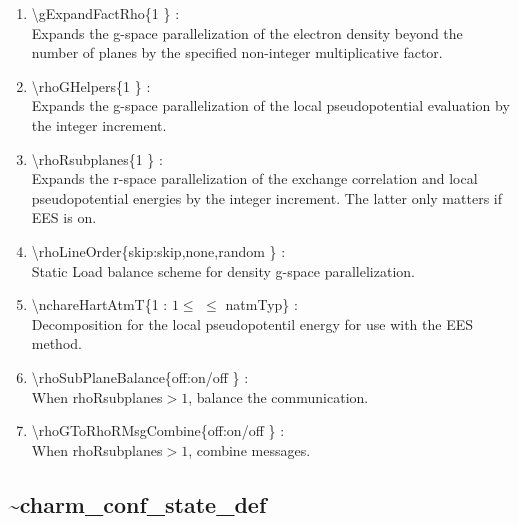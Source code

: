 \documentclass[12pt,titlepage]{article}
\begin{document}
\begin{enumerate}
  \vspace{0.15in} 
  \item \textbackslash{}gExpandFactRho\{1 \} : \\    
  Expands the g-space parallelization of the electron density beyond
  the number of planes by the specified non-integer multiplicative factor. 
  \vspace{0.15in} 
  \item \textbackslash{}rhoGHelpers\{1 \} : \\    
  Expands the g-space parallelization of the local pseudopotential
  evaluation by the integer increment.
  \vspace{0.15in} 
  \item \textbackslash{}rhoRsubplanes\{1 \} : \\    
  Expands the r-space parallelization of the exchange correlation and 
  local pseudopotential energies by the integer increment. 
  The latter only matters if EES is on.
  \vspace{0.15in} 
  \item \textbackslash{}rhoLineOrder\{skip:skip,none,random \} : \\    
  Static Load balance scheme for density g-space parallelization.
  \vspace{0.15in} 
  \item \textbackslash{}nchareHartAtmT\{1 : $1 \leq$ $\leq$ natmTyp\} : \\ 
  Decomposition for the local pseudopotentil energy for use with the 
  EES method.
  \vspace{0.15in} 
  \item \textbackslash{}rhoSubPlaneBalance\{off:on/off \} : \\    
  When rhoRsubplanes$>1$, balance the communication.
  \vspace{0.15in} 
  \item \textbackslash{}rhoGToRhoRMsgCombine\{off:on/off \} : \\    
  When rhoRsubplanes$>1$, combine messages.
\end{enumerate}

\newpage
\subsection*{\bf \~{ }charm\_conf\_state\_def}
\end{document}
